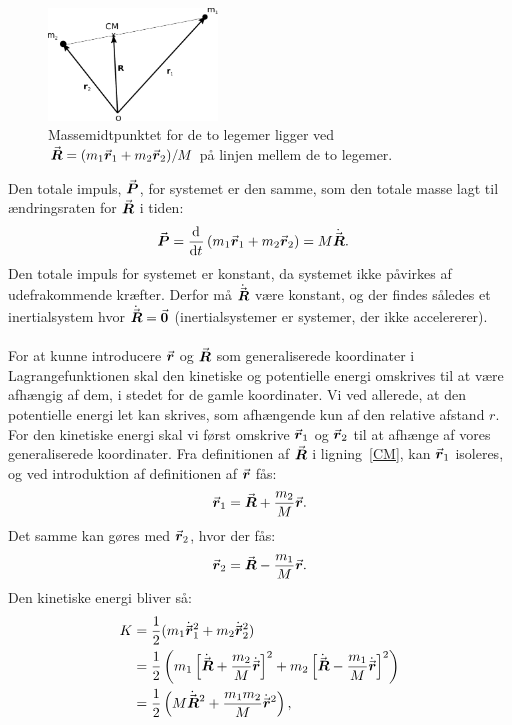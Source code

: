 %
\begin{figure}[h!]
\centering
	\includegraphics[width = 0.4\textwidth]{Planetbevaegelse/figur_CM.pdf}
	\caption{Massemidtpunktet for de to legemer ligger ved ${\vec{\boldsymbol{R}}} = (m_1 {\vec{\boldsymbol{r}}}_1 + m_2 {\vec{\boldsymbol{r}}}_2)/M$ på linjen mellem de to legemer.}
\end{figure}
Den totale impuls, ${\vec{\boldsymbol{P}}}$, for systemet er den samme, som den totale masse lagt til ændringsraten for ${\vec{\boldsymbol{R}}}$ i tiden:
\begin{align}
	{\vec{\boldsymbol{P}}} &= \frac{\mathrm{d}^{}{}}{{\mathrm{d} {t}}^{}} \left( m_1 {\vec{\boldsymbol{r}}}_{\text{1}} + m_2 {\vec{\boldsymbol{r}}}_{\text{2}} \right) = M \dot{{\vec{\boldsymbol{R}}}} .
\end{align}
Den totale impuls for systemet er konstant, da systemet ikke påvirkes af udefrakommende kræfter. Derfor må $\dot{{\vec{\boldsymbol{R}}}}$ være konstant, og der findes således et inertialsystem hvor $\dot{{\vec{\boldsymbol{R}}}}={\vec{\boldsymbol{0}}}$ (inertialsystemer er systemer, der ikke accelererer). \\ \\
%
%
For at kunne introducere ${\vec{\boldsymbol{r}}}$ og ${\vec{\boldsymbol{R}}}$ som generaliserede koordinater i Lagrangefunktionen skal den kinetiske og potentielle energi omskrives til at være afhængig af dem, i stedet for de gamle koordinater. Vi ved allerede, at den potentielle energi let kan skrives, som afhængende kun af den relative afstand $r$. For den kinetiske energi skal vi først omskrive ${\vec{\boldsymbol{r}}}_{\text{1}}$ og ${\vec{\boldsymbol{r}}}_{\text{2}}$ til at afhænge af vores generaliserede koordinater. Fra definitionen af ${\vec{\boldsymbol{R}}}$ i ligning~\eqref{CM}, kan ${\vec{\boldsymbol{r}}}_{\text{1}}$ isoleres, og ved introduktion af definitionen af ${\vec{\boldsymbol{r}}}$ fås:
\begin{align}\label{Eq:r1}
	{\vec{\boldsymbol{r}}}_{\text{1}} = {\vec{\boldsymbol{R}}} + \frac{m_2}{M}{\vec{\boldsymbol{r}}}.
\end{align}
Det samme kan gøres med ${\vec{\boldsymbol{r}}}_{\text{2}}$, hvor der fås:
\begin{align}\label{Eq:r2}
	{\vec{\boldsymbol{r}}}_{\text{2}} = {\vec{\boldsymbol{R}}} - \frac{m_1}{M} {\vec{\boldsymbol{r}}}.
\end{align}
Den kinetiske energi bliver så:
\begin{equation}
\begin{aligned}
	K &= \frac{1}{2}(m_1 \dot{{\vec{\boldsymbol{r}}}}_1^2 + m_2 \dot{{\vec{\boldsymbol{r}}}}_2^2 ) \\
	  &=\frac{1}{2} \left(m_1 \left[\dot{{\vec{\boldsymbol{R}}}} + \frac{m_2}{M}\dot{{\vec{\boldsymbol{r}}}} \right]^2 + m_2 \left[\dot{{\vec{\boldsymbol{R}}}} - \frac{m_1}{M} \dot{{\vec{\boldsymbol{r}}}}\right] ^2 \right) \\
	  &= \frac{1}{2} \left( M \dot{{\vec{\boldsymbol{R}}}}^2 + \frac{m_1m_2}{M}\dot{{\vec{\boldsymbol{r}}}}^2\right),
\end{aligned}
\end{equation}
